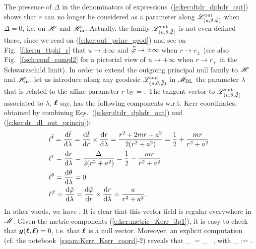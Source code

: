 The presence of $\Delta$ in the denominators of expressions~(\ref{e:ker:dtdr_dphdr_out})
shows that $r$ can no longer be considered as
a parameter along $\mathscr{L}^{\rm out}_{(u,\theta,\tilde{{\tilde\varphi}})}$ when
$\Delta=0$, i.e. on $\mathscr{H}$ and $\mathscr{H}_{\rm in}$. Actually, the family $\mathscr{L}^{\rm out}_{(u,\theta,\tilde{{\tilde\varphi}})}$ is not even defined there, since we read on
(\ref{e:ker:out_princ_geod}) and see on Fig.~\ref{f:ker:u_ttphi_r} that
$u\to\pm\infty$ and $\tilde{{\tilde\varphi}}\to \pm\infty$ when $r\to r_\pm$ (see also
Fig.~\ref{f:sch:conf_compl2} for a pictorial view of $u\to+\infty$ when $r\to r_+$ in the Schwarzschild limit).
In order to extend the outgoing principal null family to $\mathscr{H}$ and $\mathscr{H}_{\rm in}$,
let us introduce
along any geodesic $\mathscr{L}^{\rm out}_{(u,\theta,\tilde{{\tilde\varphi}})}$ in $\mathscr{M}_{\rm BL}$ the parameter $\lambda$
that is related to the affine parameter $r$ by
\be \label{e:ker:dr_dl_out_princip}
     =  .
\ee
The tangent vector to $\mathscr{L}^{\rm out}_{(u,\theta,\tilde{{\tilde\varphi}})}$ associated
to $\lambda$, $\bm{\ell}$ say, has the following components w.r.t. Kerr coordinates, obtained
by combining Eqs.~(\ref{e:ker:dtdr_dphdr_out}) and (\ref{e:ker:dr_dl_out_princip}):
\begin{align}
& \ell^{{\tilde t}} = \frac{\mathrm{d} {\tilde t}}{\mathrm{d}\lambda} = \frac{\mathrm{d} {\tilde t}}{\mathrm{d} r}\times\frac{\mathrm{d} r}{\mathrm{d}\lambda}
    = \frac{r^2 + 2m r + a^2}{2(r^2+a^2)} = \frac{1}{2} + \frac{m r}{r^2 + a^2} \nonumber \\
& \ell^{r} = \frac{\mathrm{d} r}{\mathrm{d}\lambda} = \frac{\Delta}{2(r^2+a^2)} = \frac{1}{2} - \frac{m r}{r^2 + a^2}\nonumber \\
& \ell^{\theta} = \frac{\mathrm{d} \theta}{\mathrm{d}\lambda} = 0 \nonumber\\
& \ell^{{\tilde\varphi}} = \frac{\mathrm{d} {\tilde\varphi}}{\mathrm{d}\lambda} = \frac{\mathrm{d} {\tilde\varphi}}{\mathrm{d} r}\times\frac{\mathrm{d} r}{\mathrm{d}\lambda}
    = \frac{a}{r^2+a^2} . \nonumber
\end{align}
In other words, we have
\be \label{e:ker:def_ell_outgoing}
     .
\ee
It is clear that this vector field is regular everywhere in $\mathscr{M}$.
Given the metric components (\ref{e:ker:metric_Kerr_3p1}), it is easy
to check that $\bm{g}(\bm{\ell},\bm{\ell})=0$, i.e. that $\bm{\ell}$ is a null vector.
Moreover, an explicit computation (cf. the notebook~\ref{s:sam:Kerr_Kerr_coord}-2) reveals that
\be \label{e:ker:pregeod_ell}
    \wnab_{\wl}\, \wl = \kappa_{\wl} \, \wl,
    \quad\mbox{with}\quad
    \kappa_{\wl} :=  .
